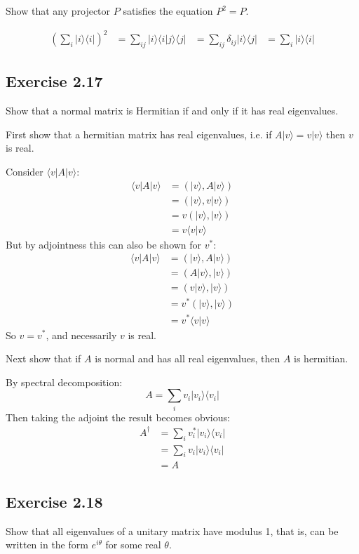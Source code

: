 \documentclass[]{article}
\newcommand{\bra}[1]{\langle #1 |}
\newcommand{\ket}[1]{| #1 \rangle}
\newcommand{\braket}[2]{\langle #1 | #2 \rangle}
\begin{document}
Show that any projector $P$ satisfies the equation $P^2 = P$.

\begin{align*}
	(\sum_i \ket{i}\bra{i})^2
	&= \sum_{ij} \ket{i}\braket{i}{j}\bra{j}
	&= \sum_{ij} \delta_{ij}\ket{i}\bra{j}
	&= \sum_i \ket{i}\bra{i}
\end{align*}

\subsection{Exercise 2.17}
Show that a normal matrix is Hermitian if and only if it has real eigenvalues.

First show that a hermitian matrix has real eigenvalues, i.e. if
$A\ket{v} = v\ket{v}$ then $v$ is real.

Consider $\bra{v}A\ket{v}$:
\begin{align*}
	\bra{v}A\ket{v}
	&= (\ket{v}, A\ket{v}) \\
	&= (\ket{v}, v\ket{v}) \\
	&= v(\ket{v}, \ket{v}) \\
&= v\braket{v}{v}
\end{align*}
But by adjointness this can also be shown for $v^*$:
\begin{align*}
	\bra{v}A\ket{v}
	&= (\ket{v}, A\ket{v}) \\
	&= (A\ket{v}, \ket{v}) \\
	&= (v\ket{v}, \ket{v}) \\
	&= v^*(\ket{v}, \ket{v}) \\
&= v^*\braket{v}{v}
\end{align*}
So $v = v^*$, and necessarily $v$ is real.

Next show that if $A$ is normal and has all real eigenvalues, then $A$ is hermitian.

By spectral decomposition:
\[A = \sum_i v_i\ket{v_i}\bra{v_i}\]
Then taking the adjoint the result becomes obvious:
\begin{align*}
A^\dagger
	&= \sum_i v_i^* \ket{v_i}\bra{v_i} \\
	&= \sum_i v_i \ket{v_i}\bra{v_i} \\
&= A
\end{align*}

\subsection{Exercise 2.18}
Show that all eigenvalues of a unitary matrix have modulus 1, that is, can be written in the form $e^{i\theta}$ for some real $\theta$.
\end{document}
